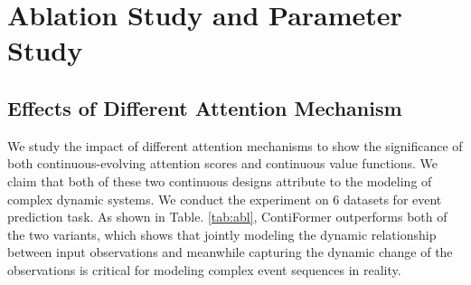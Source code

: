 \section{Ablation Study and Parameter Study}

\subsection{Effects of Different Attention Mechanism}

We study the impact of different attention mechanisms to show the significance of both continuous-evolving attention scores and continuous value functions. We claim that both of these two continuous designs attribute to the modeling of complex dynamic systems. We conduct the experiment on 6 datasets for event prediction task. As shown in Table. \ref{tab:abl}, ContiFormer outperforms both of the two variants, which shows that jointly modeling the dynamic relationship between input observations and meanwhile capturing the dynamic change of the observations is critical for modeling complex event sequences in reality.

